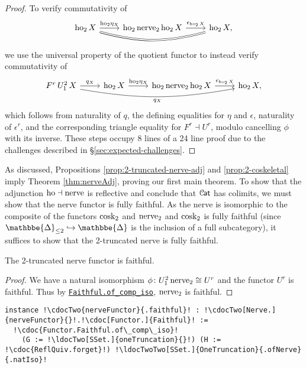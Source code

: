 \documentclass[a4paper,UKenglish,cleveref, autoref, thm-restate]{lipics-v2021}
\newcommand{\op}{\textup{op}}
\newcommand{\cosk}{\textup{cosk}}
\newcommand{\tr}{\textup{tr}}
\newcommand{\ho}{\textup{ho}}
\newcommand{\nerve}{\textup{nerve}}
\newcommand{\cat}[1]{\textup{\textsf{#1}}}%
\newcommand{\1}{\mathbbe{1}}
\newcommand{\2}{\mathbbe{2}}
\newcommand{\3}{\mathbbe{3}}
\newcommand{\DDelta}{\mathbbe{\Delta}}
\newcommand{\Cat}{\mathcal{C}{\kern-.75pt}\cat{at}}
\newcommand{\Set}{\mathcal{S}\cat{et}}
\newcommand{\cdoc}[2][]{\href{https://leanprover-community.github.io/mathlib4_docs/find/?pattern=CategoryTheory.#1#2\#doc}{\texttt{#2}}}
\newcommand{\ldocTwo}[3][]{\href{https://leanprover-community.github.io/mathlib4_docs/find/?pattern=#1#2\%E2\%82\%82#3\#doc}{\texttt{#2${}_2$#3}}}
\newcommand{\cdocTwo}[3][]{\href{https://leanprover-community.github.io/mathlib4_docs/find/?pattern=CategoryTheory.#1#2\%E2\%82\%82#3\#doc}{\texttt{#2${}_2$#3}}}
\newcommand{\ldocTwoTwo}[4][]{\href{https://leanprover-community.github.io/mathlib4_docs/find/?pattern=#1#2\%E2\%82\%82#3\%E2\%82\%82#4\#doc}{\texttt{#2${}_2$#3${}_2$#4}}}
\begin{document}
\begin{proof}
To verify commutativity of
\[ \begin{tikzcd} \ho_2\, X \arrow[r, "\ho_2 \eta_X"] \arrow[rr, bend right=15, equals] & \ho_2\,\nerve_2\,\ho_2\,X \arrow[r, "\epsilon_{\ho_2\,X}"] & \ho_2\, X, \end{tikzcd}\] we use the universal property of the quotient functor to instead verify commutativity of
\[ \begin{tikzcd} F^r\,U^2_1\, X \arrow[r, "q_X"] \arrow[rrr, bend right=10, "q_X"'] &  \ho_2\, X \arrow[r, "\ho_2 \eta_X"]  & \ho_2\,\nerve_2\,\ho_2\,X \arrow[r, "\epsilon_{\ho_2\,X}"] & \ho_2\, X,  \end{tikzcd}\] which follows from naturality of $q$, the defining equalities for $\eta$ and $\epsilon$, naturality of $\epsilon^r$, and  the corresponding triangle equality for $F^r \dashv U^r$, modulo cancelling $\phi$ with its inverse. These steps occupy 8 lines of a 24 line proof due to the challenges described in \S\ref{sec:expected-challenges}.
\end{proof}

As discussed, Propositions \ref{prop:2-truncated-nerve-adj} and \ref{prop:2-coskeletal} imply Theorem \ref{thm:nerveAdj}, proving our first main theorem. To show that the adjunction $\ho \dashv \nerve$ is reflective and conclude that $\Cat$ has colimits, we must show that the nerve functor is fully faithful. As the nerve is isomorphic to the composite of the functors $\cosk_2$ and $\nerve_2$ and $\cosk_2$ is fully faithful (since $\DDelta_{\leq 2} \hookrightarrow \DDelta$ is the inclusion of a full subcategory), it suffices to show that the 2-truncated nerve is fully faithful.

\begin{lemma}[\cdocTwo{nerveFunctor}{.faithful}]
  The 2-truncated nerve functor is faithful.
\end{lemma}
\begin{proof}
  We have a natural isomorphism $\phi \colon U_1^2\, \nerve_2 \cong U^r$ and the functor $U^r$ is faithful. Thus by \cdoc[Functor.]{Faithful.of\_comp\_iso}, $\nerve_2$ is faithful.
\end{proof}
\begin{lstlisting}
instance !\cdocTwo{nerveFunctor}{.faithful}! : !\cdocTwo[Nerve.]{nerveFunctor}{}!.!\cdoc[Functor.]{Faithful}! :=
  !\cdoc{Functor.Faithful.of\_comp\_iso}!
    (G := !\ldocTwo[SSet.]{oneTruncation}{}!) (H := !\cdoc{ReflQuiv.forget}!) !\ldocTwoTwo[SSet.]{OneTruncation}{.ofNerve}{.natIso}!
\end{lstlisting}
\end{document}
